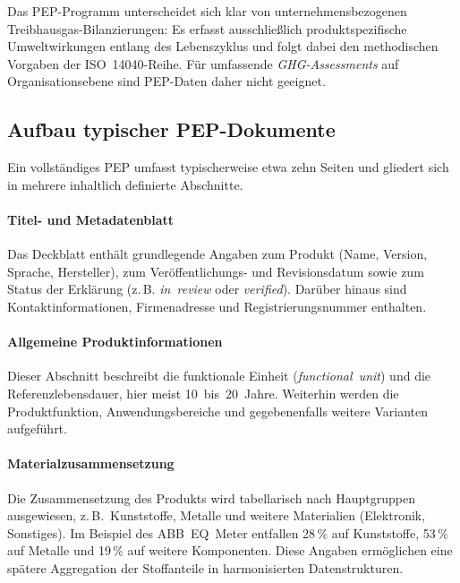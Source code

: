 Das PEP-Programm unterscheidet sich klar von unternehmensbezogenen Treibhausgas-Bilanzierungen: 
Es erfasst ausschließlich produktspezifische Umweltwirkungen entlang des Lebenszyklus und folgt dabei den methodischen Vorgaben der ISO~14040-Reihe. 
Für umfassende \emph{GHG-Assessments} auf Organisationsebene sind PEP-Daten daher nicht geeignet.
\cite{PEP}

\subsection{Aufbau typischer PEP-Dokumente}

Ein vollständiges PEP umfasst typischerweise etwa zehn Seiten und gliedert sich in mehrere inhaltlich definierte Abschnitte.

\paragraph{Titel- und Metadatenblatt}
Das Deckblatt enthält grundlegende Angaben zum Produkt (Name, Version, Sprache, Hersteller), zum Veröffentlichungs- und Revisionsdatum
sowie zum Status der Erklärung (z.\,B. \emph{in~review} oder \emph{verified}). Darüber hinaus sind Kontaktinformationen, Firmenadresse und 
Registrierungsnummer enthalten. 

\paragraph{Allgemeine Produktinformationen}
Dieser Abschnitt beschreibt die funktionale Einheit (\emph{functional~unit}) und die Referenzlebensdauer, hier meist 10~bis~20~Jahre. 
Weiterhin werden die Produktfunktion, Anwendungsbereiche und gegebenenfalls weitere Varianten aufgeführt. 

\paragraph{Materialzusammensetzung}
Die Zusammensetzung des Produkts wird tabellarisch nach Hauptgruppen ausgewiesen, z.\,B.\ Kunststoffe, Metalle und weitere Materialien 
(Elektronik, Sonstiges). Im Beispiel des ABB~EQ~Meter entfallen 28\,\% auf Kunststoffe, 53\,\% auf Metalle und 19\,\% auf weitere Komponenten. 
Diese Angaben ermöglichen eine spätere Aggregation der Stoffanteile in harmonisierten Datenstrukturen.

